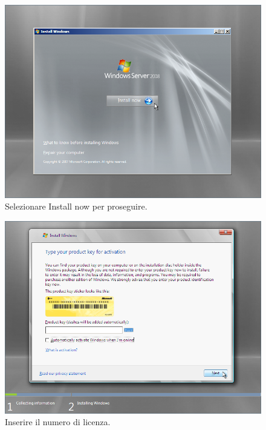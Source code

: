 \begin{figure}[htbp]
 \centering
 \includegraphics[scale=0.5]{images/grab0004}
 \caption{Selezionare Install now per proseguire.}
\label{fig:grab0004}
\end{figure}

\begin{figure}[htbp]
 \centering
 \includegraphics[scale=0.5]{images/grab0005}
 \caption{Inserire il numero di licenza.}
\label{fig:grab0005}
\end{figure}

